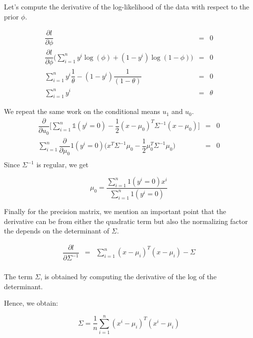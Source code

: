 \begin{answer}
  Let's compute the derivative of the log-likelihood of the data with respect to
  the prior $\phi$.

  \begin{eqnarray}
    \dfrac{\partial l}{\partial \phi} &=& 0\\
    \dfrac{\partial l}{\partial \phi}\big(\sum_{i=1}^n y^i\log(\phi) +
  (1-y^i)\log(1-\phi) \big) &=& 0\\
  \sum_{i=1}^n y^i\dfrac{1}{\theta} -(1-y^i)\dfrac{1}{(1-\theta)}&=&0\\
  \sum_{i=1}^n y^i &=&\theta
  \end{eqnarray}


We repeat the same work on the conditional means $u_1$ and $u_0$.
\newcommand{\precision}{\Sigma^{-1}}
\begin{eqnarray}
 \dfrac{\partial}{\partial
    u_0}\Big[\sum_{i=1}^n \mathbb{1}(y^i=0)
  -\dfrac{1}{2}(x-\mu_0)^T\precision(x-\mu_0)\Big]&=&0\\
  \sum_{i=1}^n \dfrac{\partial}{\partial \mu_0} 1(y^i=0)\big(x^T \precision \mu_0 -
\dfrac{1}{2}\mu_0^T\precision\mu_0\big)&=&0\\
\end{eqnarray}
Since $\precision$ is regular, we get

\begin{equation}
  \mu_0  = \dfrac{\sum_{i=1}^n 1(y^i=0)x^i}{\sum_{i=1}^n 1(y^i=0)}
\end{equation}


Finally for the precision matrix, we mention an important point that the
derivative can be from either the quadratic term but also the normalizing factor
the depends on the determinant of $\Sigma$.

\begin{eqnarray}
  \dfrac{\partial l}{\partial \precision} &=&\sum_{i=1}^n (x-\mu_i)^T(x-\mu_i) -
  \Sigma\\
\end{eqnarray}

The term $\Sigma$, is obtained by computing the derivative of the log of the
determinant.

Hence, we obtain:

\begin{equation}
  \Sigma =\dfrac{1}{n} \sum_{i=1}^n (x^i - \mu_{i})^T(x^i- \mu_{i})
\end{equation}


\end{answer}

